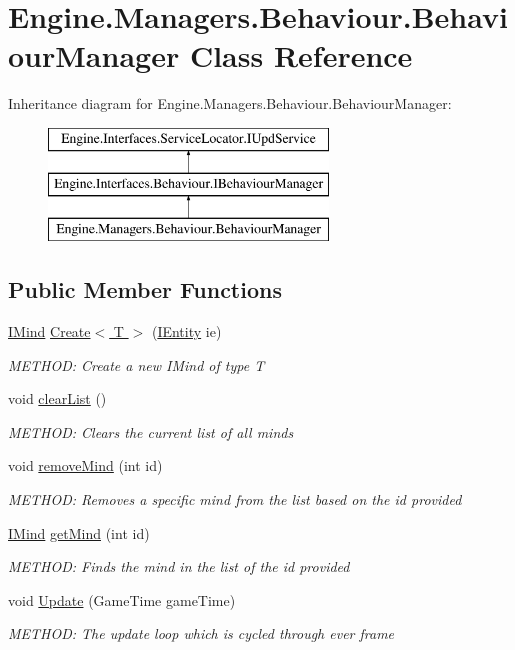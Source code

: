 \hypertarget{a00486}{}\section{Engine.\+Managers.\+Behaviour.\+Behaviour\+Manager Class Reference}
\label{a00486}
Inheritance diagram for Engine.\+Managers.\+Behaviour.\+Behaviour\+Manager\+:\begin{figure}[H]
\begin{center}
\leavevmode
\includegraphics[height=3.000000cm]{db/df1/a00486}
\end{center}
\end{figure}
\subsection*{Public Member Functions}
\begin{DoxyCompactItemize}
\item 
\hyperlink{a00446}{I\+Mind} \hyperlink{a00486_a13eea511ff6d2cdeb8287b63034ce898}{Create$<$ T $>$} (\hyperlink{a00438}{I\+Entity} ie)
\begin{DoxyCompactList}\small\item\em M\+E\+T\+H\+OD\+: Create a new I\+Mind of type T \end{DoxyCompactList}\item 
void \hyperlink{a00486_ae21fe19ea423236e26d4f022230a071e}{clear\+List} ()
\begin{DoxyCompactList}\small\item\em M\+E\+T\+H\+OD\+: Clears the current list of all minds \end{DoxyCompactList}\item 
void \hyperlink{a00486_a684853fb49121d19f4d5c635153b871a}{remove\+Mind} (int id)
\begin{DoxyCompactList}\small\item\em M\+E\+T\+H\+OD\+: Removes a specific mind from the list based on the id provided \end{DoxyCompactList}\item 
\hyperlink{a00446}{I\+Mind} \hyperlink{a00486_a4391a84eadd13a812977cd51e177e00b}{get\+Mind} (int id)
\begin{DoxyCompactList}\small\item\em M\+E\+T\+H\+OD\+: Finds the mind in the list of the id provided \end{DoxyCompactList}\item 
void \hyperlink{a00486_a729bf10d2469de0497d75dfadbf56506}{Update} (Game\+Time game\+Time)
\begin{DoxyCompactList}\small\item\em M\+E\+T\+H\+OD\+: The update loop which is cycled through ever frame \end{DoxyCompactList}\end{DoxyCompactItemize}


